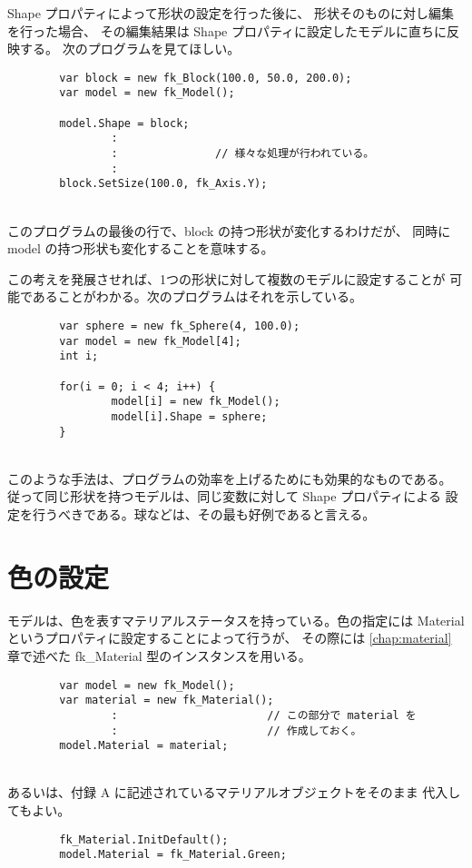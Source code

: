 Shape プロパティによって形状の設定を行った後に、
形状そのものに対し編集を行った場合、
その編集結果は Shape プロパティに設定したモデルに直ちに反映する。
次のプログラムを見てほしい。
\\
\begin{breakbox}
\begin{verbatim}
        var block = new fk_Block(100.0, 50.0, 200.0);
        var model = new fk_Model();

        model.Shape = block;
                :
                :               // 様々な処理が行われている。
                :
        block.SetSize(100.0, fk_Axis.Y);
\end{verbatim}
\end{breakbox}
~ \\
このプログラムの最後の行で、block の持つ形状が変化するわけだが、
同時に model の持つ形状も変化することを意味する。

この考えを発展させれば、1つの形状に対して複数のモデルに設定することが
可能であることがわかる。次のプログラムはそれを示している。
\\
\begin{breakbox}
\begin{verbatim}
        var sphere = new fk_Sphere(4, 100.0);
        var model = new fk_Model[4];
        int i;

        for(i = 0; i < 4; i++) {
                model[i] = new fk_Model();
                model[i].Shape = sphere;
        }
\end{verbatim}
\end{breakbox}
~ \\
このような手法は、プログラムの効率を上げるためにも効果的なものである。
従って同じ形状を持つモデルは、同じ変数に対して Shape プロパティによる
設定を行うべきである。球などは、その最も好例であると言える。

\section{色の設定}
モデルは、色を表すマテリアルステータスを持っている。色の指定には
Material というプロパティに設定することによって行うが、
その際には \ref{chap:material} 章で述べた
fk\_Material 型のインスタンスを用いる。
\\
\begin{screen}
\begin{verbatim}
        var model = new fk_Model();
        var material = new fk_Material();
                :                       // この部分で material を
                :                       // 作成しておく。
        model.Material = material;
\end{verbatim}
\end{screen}
~ \\
あるいは、付録 A に記述されているマテリアルオブジェクトをそのまま
代入してもよい。
\\
\begin{screen}
\begin{verbatim}
        fk_Material.InitDefault();
        model.Material = fk_Material.Green;
\end{verbatim}
\end{screen}

